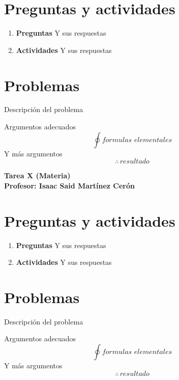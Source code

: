 \documentclass[letterpaper,10pt]{article}%
\begin{document}
\begin{center}
\end{center}

\setcounter{section}{0}
\section{Preguntas y actividades}
\begin{enumerate}
    \item \textbf{Preguntas}
    Y sus respuestas
    \item \textbf{Actividades}
    Y sus respuestas
\end{enumerate}

\section{Problemas}
\begin{tcolorbox}[title=problema 1]
Descripción del problema
\end{tcolorbox}
Argumentos adecuados
\begin{equation}
    \oint formulas\,\,elementales
\end{equation}
Y más argumentos
\begin{equation*}
    \therefore\,resultado
\end{equation*}
\newpage

\begin{center}
    \huge \textbf{Tarea X (Materia)}\\
    \vspace{0.25cm}
    \large \textbf{Profesor: Isaac Said Martínez Cerón}\\
    \vspace{0.2cm}
\end{center}

\setcounter{section}{0}
\section{Preguntas y actividades}
\begin{enumerate}
    \item \textbf{Preguntas}
    Y sus respuestas
    \item \textbf{Actividades}
    Y sus respuestas
\end{enumerate}

\section{Problemas}
\begin{tcolorbox}[title=problema 1]
Descripción del problema
\end{tcolorbox}
Argumentos adecuados
\begin{equation}
    \oint formulas\,\,elementales
\end{equation}
Y más argumentos
\begin{equation*}
    \therefore\,resultado
\end{equation*}
\end{document}
